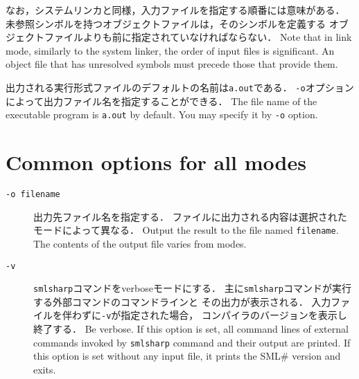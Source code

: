 \documentclass{jbook}
\newcommand{\txt}[2]{#2}
\newcommand{\smlsharp}{SML\#}
\newcommand{\term}[1]{\mbox{{\tt #1}}}
\begin{document}
\begin{itemize}
\ifjp%
	なお，システムリンカと同様，入力ファイルを指定する順番には意味がある．
	未参照シンボルを持つオブジェクトファイルは，そのシンボルを定義する
オブジェクトファイルよりも前に指定されていなければならない．
\else%
	Note that in link mode, similarly to the system linker,
the order of input files is significant.
	An object file that has unresolved symbols must precede those
that provide them.
\fi%

\ifjp%
	出力される実行形式ファイルのデフォルトの名前は{\tt a.out}である．
        {\tt -o}オプションによって出力ファイル名を指定することができる．
\else%
	The file name of the executable program is {\tt a.out} by default.
	You may specify it by {\tt -o} option.
\fi%

\end{itemize}

\section{\txt{モード共通のオプション}{Common options for all modes}}

\begin{description}

\item[{\tt -o \term{filename}}]
\ifjp%
	出力先ファイル名を指定する．
        ファイルに出力される内容は選択されたモードによって異なる．
\else%
	Output the result to the file named \term{filename}.
        The contents of the output file varies from modes.
\fi%

\item[{\tt -v}]
\ifjp%
	{\tt smlsharp}コマンドをverboseモードにする．
	主に{\tt smlsharp}コマンドが実行する外部コマンドのコマンドラインと
その出力が表示される．
	入力ファイルを伴わずに{\tt -v}が指定された場合，
コンパイラのバージョンを表示し終了する．
\else%
	Be verbose.
	If this option is set,
all command lines of external commands invoked by {\tt smlsharp} command
and their output are printed.
	If this option is set without any input file,
it prints the \smlsharp{} version and exits.
\fi%

\end{description}
\end{document}

